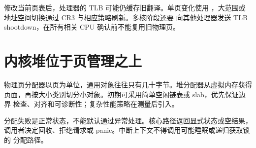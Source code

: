 修改当前页表后，处理器的 TLB 可能仍缓存旧翻译。单页变化使用
，大范围或地址空间切换通过 CR3 与相应策略刷新。多核阶段还要
向其他处理器发送 TLB shootdown，在所有相关 CPU 确认前不能复用旧物理页。

\section{内核堆位于页管理之上}

物理页分配器以页为单位，通用对象往往只有几十字节。堆分配器从虚拟内存获得
页面，再按大小类别切分小对象。初期可采用简单空闲链表或 slab，优先保证边界
检查、对齐和可诊断性；复杂性能策略在测量后引入。

分配失败是正常状态，不能默认通过异常处理。核心路径返回显式状态或空结果，
调用者决定回收、拒绝请求或 panic。中断上下文不得调用可能睡眠或递归获取锁的
分配路径。
